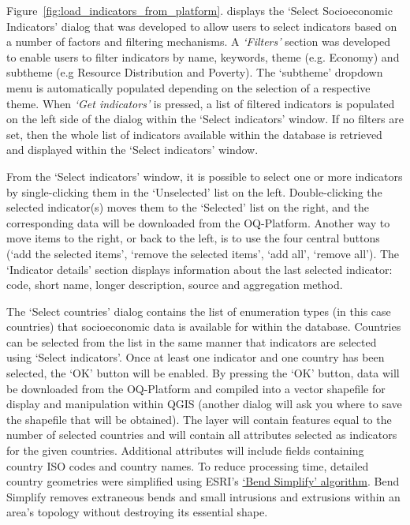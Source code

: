 Figure~\ref{fig:load_indicators_from_platform}. displays the `Select
Socioeconomic Indicators' dialog that was developed to allow users to select
indicators based on a number of factors and filtering mechanisms. A
\emph{`Filters'} section was developed to enable users to filter indicators by
name, keywords, theme (e.g. Economy) and subtheme (e.g Resource Distribution
and Poverty). The `subtheme' dropdown menu is automatically populated depending
on the selection of a respective theme. When \emph{`Get indicators'} is
pressed, a list of filtered indicators is populated on the left side of the
dialog within the `Select indicators' window. If no filters are set, then the
whole list of indicators available within the database is retrieved and
displayed within the `Select indicators' window.

From the `Select indicators' window, it is possible to select one or more
indicators by single-clicking them in the `Unselected' list on the left.
Double-clicking the selected indicator(s) moves them to the `Selected' list on
the right, and the corresponding data will be downloaded from the OQ-Platform.
Another way to move items to the right, or back to the left, is to use the four
central buttons (`add the selected items', `remove the selected items', `add
all', `remove all'). The `Indicator details' section displays information about
the last selected indicator: code, short name, longer description, source and
aggregation method.

The `Select countries' dialog contains the list of enumeration types (in this
case countries) that socioeconomic data is available for within the database.
Countries can be selected from the list in the same manner that indicators are
selected using `Select indicators'. Once at least one indicator and one country
has been selected, the `OK' button will be enabled. By pressing the `OK'
button, data will be downloaded from the OQ-Platform and compiled into a vector
shapefile for display and manipulation within QGIS (another dialog will ask you
where to save the shapefile that will be obtained). The layer will contain
features equal to the number of selected countries and will contain all
attributes selected as indicators for the given countries. Additional
attributes will include fields containing country ISO codes and country names.
To reduce processing time, detailed country geometries were simplified using
ESRI's
\href{http://resources.arcgis.com/en/help/main/10.1/index.html#//007000000010000000}
{`Bend Simplify' algorithm}. Bend Simplify removes extraneous bends and small
intrusions and extrusions within an area's topology without destroying its
essential shape.

